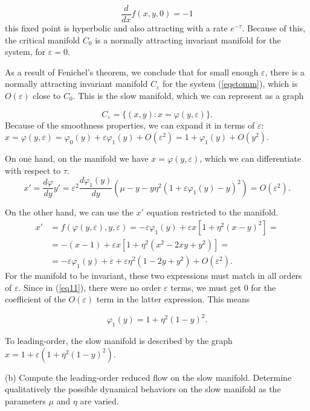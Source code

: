 \begin{solution}[9.7]
$$
\frac{d}{dx}f(x,y,0) = -1
$$
this fixed point is hyperbolic and also attracting with a rate $e^{-\tau}$. Because of this, the critical manifold $C_0$ is a normally attracting invariant manifold for the system, for $\varepsilon = 0$. 

As a result of Fenichel's theorem, we conclude that for small enough $\varepsilon$, there is a normally attracting invariant manifold $C_\varepsilon$ for the system (\ref{eqstomm}), which is $O(\varepsilon)$ close to $C_0$. This is the slow manifold, which we can represent as a graph

$$
C_\varepsilon = \{ (x,y): x = \varphi(y,\varepsilon)\}.
$$
Because of the smoothness properties, we can expand it in terms of $\varepsilon$: $x = \varphi(y,\varepsilon) = \varphi_0(y) + \varepsilon \varphi_1(y) + O(\varepsilon^2) = 1+\varphi_1(y)+O(y^2)$.


On one hand, on the manifold we have $x = \varphi(y,\varepsilon)$, which we can differentiate with respect to $\tau$.
\begin{equation}
    \label{eq11}
    x' = \frac{d \varphi}{d y} y' = \varepsilon^2 \frac{d\varphi_1(y)}{dy}\left( \mu- y -y\eta^2(1+\varepsilon\varphi_1(y) -y)^2\right) = O(\varepsilon^2).
\end{equation}

On the other hand, we can use the $x'$ equation restricted to the manifold. 
\begin{align*}
        \label{eq22}
    x' &= f(\varphi(y,\varepsilon),y,\varepsilon) = -\varepsilon \varphi_1(y) + \varepsilon x[1+\eta^2(x-y)^2]= \\
    &= -(x-1) + \varepsilon x[1+\eta^2(x^2-2xy + y^2)] = \\
    &= -\varepsilon\varphi_1(y) + \varepsilon + \varepsilon \eta^2(1-2y +y^2) +O(\varepsilon^2).
\end{align*}
For the manifold to be invariant, these two expressions must match in all orders of $\varepsilon$. Since in (\ref{eq11}), there were no order $\varepsilon$ terms, we must get 0 for the coefficient of the $O(\varepsilon)$ term in the latter expression. This means

$$
\varphi_1(y)= 1 + \eta^2(1-y)^2.
$$

To leading-order, the slow manifold is described by the graph $x = 1 + \varepsilon(1+\eta^2(1-y)^2)$.

(b) Compute the leading-order reduced flow on the slow manifold. Determine qualitatively the possible dynamical behaviors on the slow manifold as the parameters $\mu$ and $\eta$ are varied.


\end{solution}
